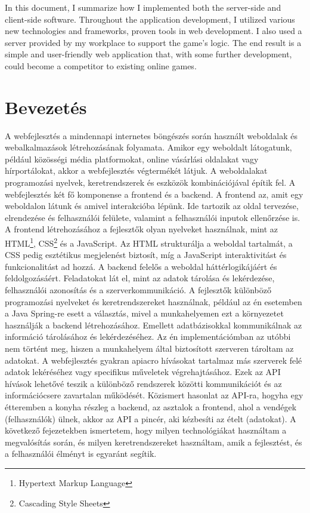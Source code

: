 \documentclass[a4paper,twoside]{article}
\begin{document}
In this document, I summarize how I implemented both the server-side and client-side software. Throughout the application development, I utilized various new technologies and frameworks, proven tools in web development. I also used a server provided by my workplace to support the game's logic. The end result is a simple and user-friendly web application that, with some further development, could become a competitor to existing online games.
\newpage
\section{Bevezetés}
A webfejlesztés a mindennapi internetes böngészés során használt weboldalak és
webalkalmazások létrehozásának folyamata. Amikor egy weboldalt látogatunk, például
közösségi média platformokat, online vásárlási oldalakat vagy hírportálokat, akkor a
webfejlesztés végtermékét látjuk.
A weboldalakat programozási nyelvek, keretrendszerek és eszközök kombinációjával építik
fel. A webfejlesztés két fő komponense a frontend és a backend.
A frontend az, amit egy weboldalon látunk és amivel interakcióba lépünk. Ide tartozik az
oldal tervezése, elrendezése és felhasználói felülete, valamint a felhasználói inputok
ellenőrzése is. A frontend létrehozásához a fejlesztők olyan nyelveket használnak, mint az
HTML\footnote{Hypertext Markup Language}, CSS\footnote{Cascading Style Sheets} és a JavaScript. Az
HTML strukturálja a weboldal tartalmát, a CSS pedig esztétikus megjelenést biztosít, míg a
JavaScript interaktivitást és funkcionalitást ad hozzá.
A backend felelős a weboldal háttérlogikájáért és feldolgozásáért. Feladatokat lát el, mint az
adatok tárolása és lekérdezése, felhasználói azonosítás és a szerverkommunikáció. A
fejlesztők különböző programozási nyelveket és keretrendszereket használnak, például az én esetemben a
Java Spring\cite{javaspring}-re esett a választás, mivel a munkahelyemen ezt a környezetet használják a
backend létrehozásához. Emellett adatbázisokkal kommunikálnak az információ tárolásához
és lekérdezéséhez. Az én implementációmban az utóbbi nem történt meg, hiszen a
munkahelyem által biztosított szerveren tároltam az adatokat.
A webfejlesztés gyakran \acrshort{apiacro} hívásokat tartalmaz más
szerverek felé adatok lekéréséhez vagy specifikus műveletek végrehajtásához. Ezek az API
hívások lehetővé teszik a különböző rendszerek közötti kommunikációt és az információcsere
zavartalan működését. Közismert hasonlat az API-ra, hogyha egy étteremben a konyha
részleg a backend, az asztalok a frontend, ahol a vendégek (felhasználók) ülnek, akkor az API
a pincér, aki kézbesíti az ételt (adatokat).
A következő fejezetekben ismertetem, hogy milyen technológiákat használtam a megvalósítás során, és milyen keretrendszereket használtam, amik a fejlesztést, és a felhasználói élményt is
egyaránt segítik.
\newpage
\end{document}
